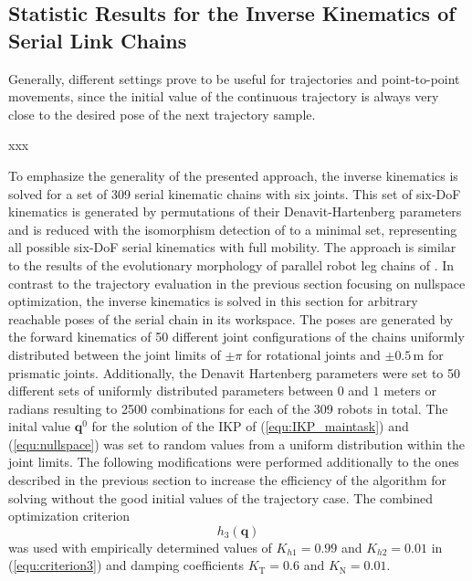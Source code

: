 \documentclass[robotics,article,submit,moreauthors,pdftex]{Definitions/mdpi}
\newcommand{\bm}[1]{\boldsymbol{#1}}
\begin{document}
\subsection{Statistic Results for the Inverse Kinematics of Serial Link Chains}
\label{sec:Ergebnisse_IK_Statistik}

Generally, different settings prove to be useful for trajectories and point-to-point movements, since the initial value of the continuous trajectory is always very close to the desired pose of the next trajectory sample.

xxx

To emphasize the generality of the presented approach, the inverse kinematics is solved for a set of 309 serial kinematic chains with six joints.
This set of six-DoF kinematics is generated by permutations of their Denavit-Hartenberg parameters and is reduced with the isomorphism detection of \cite{RamirezKotOrt2015} to a minimal set, representing all possible six-DoF serial kinematics with full mobility.
The approach is similar to the results of the evolutionary morphology of parallel robot leg chains of \cite{Gogu2008}.
In contrast to the trajectory evaluation in the previous section focusing on nullspace optimization, the inverse kinematics is solved in this section for arbitrary reachable poses of the serial chain in its workspace.
The poses are generated by the forward kinematics of 50 different joint configurations of the chains uniformly distributed between the joint limits of $\pm \pi$ for rotational joints and $\pm0.5\,\mathrm{m}$ for prismatic joints.
Additionally, the Denavit Hartenberg parameters were set to 50 different sets of uniformly distributed parameters between $0$ and $1$ meters or radians resulting to 2500 combinations for each of the 309 robots in total.
The inital value $\bm{q}^0$ for the solution of the IKP of (\ref{equ:IKP_maintask}) and
(\ref{equ:nullspace}) was set to random values from a uniform distribution within the joint limits.
The following modifications were performed additionally to the ones described in the previous section to increase the efficiency of the algorithm for solving without the good initial values of the trajectory case.
The combined optimization criterion
%
\begin{equation}
h_3(\bm{q})
\end{equation}
%
was used with empirically determined values of $K_{h1}=0.99$ and $K_{h2}=0.01$ in (\ref{equ:criterion3}) and damping coefficients $K_{\mathrm{T}}=0.6$ and $K_{\mathrm{N}}=0.01$.
\end{document}
